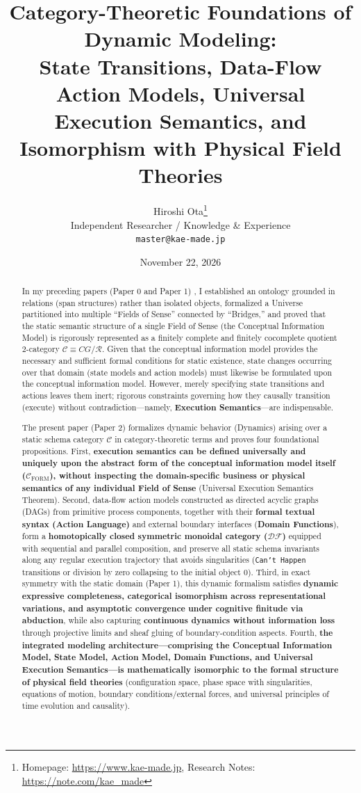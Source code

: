 \documentclass[11pt,a4paper]{article}
\title{\textbf{Category-Theoretic Foundations of Dynamic Modeling:\\
State Transitions, Data-Flow Action Models, Universal Execution Semantics, and Isomorphism with Physical Field Theories}}
\author{Hiroshi Ota\thanks{Homepage: \url{https://www.kae-made.jp}, Research Notes: \url{https://note.com/kae_made}} \\
\small Independent Researcher / Knowledge \& Experience \\
\small \texttt{master@kae-made.jp}}
\date{November 22, 2026}
\theoremstyle{definition}
\theoremstyle{plain}
\theoremstyle{remark}
\newcommand{\DF}{\mathcal{DF}}
\newcommand{\Cform}{\mathcal{C}_{\mathrm{FORM}}}
\begin{document}
\maketitle

\begin{abstract}
In my preceding papers (Paper 0 and Paper 1) \cite{ota2026paper0,ota2026paper1}, I established an ontology grounded in relations (span structures) rather than isolated objects, formalized a Universe partitioned into multiple ``Fields of Sense'' connected by ``Bridges,'' and proved that the static semantic structure of a single Field of Sense (the Conceptual Information Model) is rigorously represented as a finitely complete and finitely cocomplete quotient 2-category $\mathcal{C} \equiv CG/\mathcal{R}$. Given that the conceptual information model provides the necessary and sufficient formal conditions for static existence, state changes occurring over that domain (state models and action models) must likewise be formulated upon the conceptual information model. However, merely specifying state transitions and actions leaves them inert; rigorous constraints governing how they causally transition (execute) without contradiction---namely, \textbf{Execution Semantics}---are indispensable.

The present paper (Paper 2) formalizes dynamic behavior (Dynamics) arising over a static schema category $\mathcal{C}$ in category-theoretic terms and proves four foundational propositions. First, \textbf{execution semantics can be defined universally and uniquely upon the abstract form of the conceptual information model itself ($\Cform$), without inspecting the domain-specific business or physical semantics of any individual Field of Sense} (Universal Execution Semantics Theorem). Second, data-flow action models constructed as directed acyclic graphs (DAGs) from primitive process components, together with their \textbf{formal textual syntax (Action Language)} and external boundary interfaces (\textbf{Domain Functions}), form a \textbf{homotopically closed symmetric monoidal category ($\DF$)} equipped with sequential and parallel composition, and preserve all static schema invariants along any regular execution trajectory that avoids singularities (\texttt{Can't Happen} transitions or division by zero collapsing to the initial object $0$). Third, in exact symmetry with the static domain (Paper 1), this dynamic formalism satisfies \textbf{dynamic expressive completeness, categorical isomorphism across representational variations, and asymptotic convergence under cognitive finitude via abduction}, while also capturing \textbf{continuous dynamics without information loss} through projective limits and sheaf gluing of boundary-condition aspects. Fourth, \textbf{the integrated modeling architecture---comprising the Conceptual Information Model, State Model, Action Model, Domain Functions, and Universal Execution Semantics---is mathematically isomorphic to the formal structure of physical field theories} (configuration space, phase space with singularities, equations of motion, boundary conditions/external forces, and universal principles of time evolution and causality).
\end{abstract}
\end{document}
